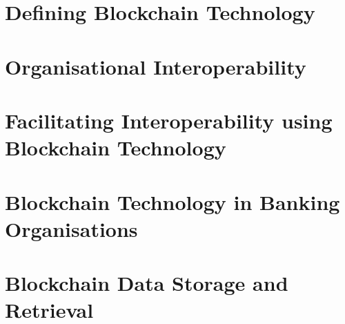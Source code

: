 \section{Defining Blockchain Technology}

\section{Organisational Interoperability}

\section{Facilitating Interoperability using Blockchain Technology}

\section{Blockchain Technology in Banking Organisations}

\section{Blockchain Data Storage and Retrieval}